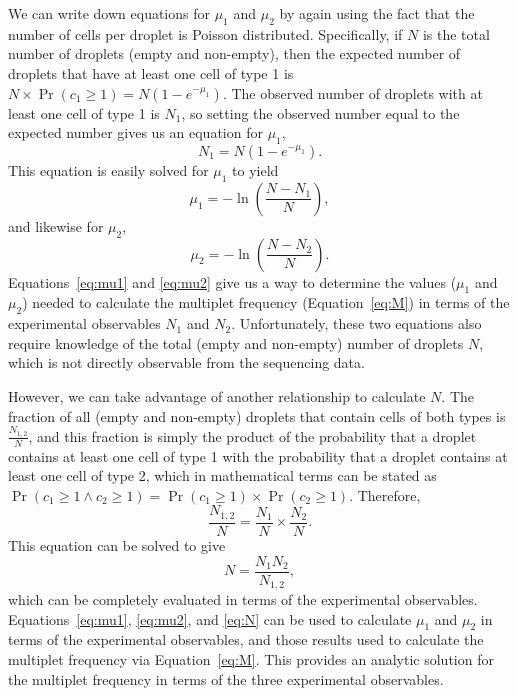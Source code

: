 \documentclass[fleqn,10pt,lineno]{wlpeerj} %
\begin{document}
We can write down equations for $\mu_1$ and $\mu_2$ by again using the fact that the number of cells per droplet is Poisson distributed.
Specifically, if $N$ is the total number of droplets (empty and non-empty), then the expected number of droplets that have at least one cell of type 1 is $N \times \Pr\left(c_1 \ge 1\right) = N \left(1 - e^{-\mu_1}\right)$.
The observed number of droplets with at least one cell of type 1 is $N_1$, so setting the observed number equal to the expected number gives us an equation for $\mu_1$,
\begin{equation}
N_1 = N \left(1 - e^{-\mu_1}\right).
\end{equation}
This equation is easily solved for $\mu_1$ to yield
\begin{equation}
\label{eq:mu1}
\mu_1 = -\ln\left(\frac{N - N_1}{N}\right),
\end{equation}
and likewise for $\mu_2$,
\begin{equation}
\label{eq:mu2}
\mu_2 = -\ln\left(\frac{N - N_2}{N}\right).
\end{equation}
Equations~\ref{eq:mu1} and \ref{eq:mu2} give us a way to determine the values ($\mu_1$ and $\mu_2$) needed to calculate the multiplet frequency (Equation~\ref{eq:M}) in terms of the experimental observables $N_1$ and $N_2$.
Unfortunately, these two equations also require knowledge of the total (empty and non-empty) number of droplets $N$, which is not directly observable from the sequencing data.

However, we can take advantage of another relationship to calculate $N$.
The fraction of all (empty and non-empty) droplets that contain cells of both types is $\frac{N_{1,2}}{N}$, and this fraction is simply the product of the probability that a droplet contains at least one cell of type 1 with the probability that a droplet contains at least one cell of type 2, which in mathematical terms can be stated as $\Pr\left(c_1 \ge 1 \land c_2 \ge 1\right) = \Pr\left(c_1 \ge 1\right) \times \Pr\left(c_2 \ge 1\right)$.
Therefore,
\begin{equation}
\frac{N_{1,2}}{N} = \frac{N_1}{N} \times \frac{N_2}{N}.
\end{equation}
This equation can be solved to give
\begin{equation}
\label{eq:N}
N = \frac{N_1 N_2}{N_{1,2}},
\end{equation}
which can be completely evaluated in terms of the experimental observables.
Equations~\ref{eq:mu1}, \ref{eq:mu2}, and \ref{eq:N} can be used to calculate $\mu_1$ and $\mu_2$ in terms of the experimental observables, and those results used to calculate the multiplet frequency via Equation~\ref{eq:M}.
This provides an analytic solution for the multiplet frequency in terms of the three experimental observables.
\end{document}
